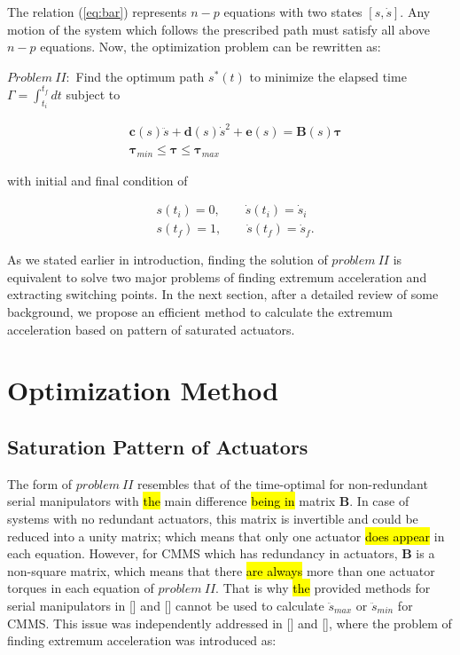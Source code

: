 \documentclass{rob}%
\begin{document}
The relation (\ref{eq:bar}) represents $ n-p $ equations with two states $ [s, \dot s] $. Any motion of the system which follows the prescribed path must satisfy all above $ n-p $ equations. Now, the optimization problem can be rewritten as:\medskip

$ Problem \ II: $ Find the optimum path $ s^*(t) $ to minimize the elapsed time $ \Gamma=\int_{t_{i}}^{t_{f}} dt $ subject to

\begin{equation}
\label{eq:P2}
\begin{aligned}
&{\boldsymbol c}(s)\ddot s+{\boldsymbol d}(s)\dot s^2+{\boldsymbol e}(s)={\mathbf B}(s)\boldsymbol \tau \\
&\boldsymbol \tau_{min}\leq \boldsymbol \tau \leq  \boldsymbol \tau_{max}
\end{aligned}
\end{equation}

\noindent
with initial and final condition of

\begin{equation}
\begin{aligned}
&s(t_i)=0,\qquad {\dot s}(t_i)=\dot s_i \\
&s(t_f)=1,\qquad {\dot s}(t_f)=\dot s_f. \nonumber
\end{aligned}
\end{equation}

As we stated earlier in introduction, finding the solution of $ problem \ II $ is equivalent to solve two major problems of finding extremum acceleration and extracting switching points.
In the next section, after a detailed review of some background, we propose an efficient method to calculate the extremum acceleration based on pattern of saturated actuators.


\section{Optimization Method}
\label{sec:OM}

\subsection{Saturation Pattern of Actuators}
\label{subsec:SPA}

The form of  $ problem \ II $ resembles that of the time-optimal for non-redundant serial manipulators with \hl{the} main difference \hl{being in} matrix $ \mathbf B $. In case of systems with no redundant actuators, this matrix is invertible and could be reduced into a unity matrix; which means that 
only one actuator \hl{does appear} in each equation.  
However, for CMMS which has redundancy in actuators, $ \mathbf{{B}} $ is a non-square matrix, which means that there \hl{are always} more than one actuator torques in each equation of $ problem \ II $. That is why \hl{the} provided methods  for serial manipulators in [] and [] cannot be used to calculate $  {\ddot s}_{max} $ or $  {\ddot s}_{min} $ for CMMS.
This issue was independently addressed in [] and [], where the problem of finding extremum acceleration was introduced as:
\end{document}
